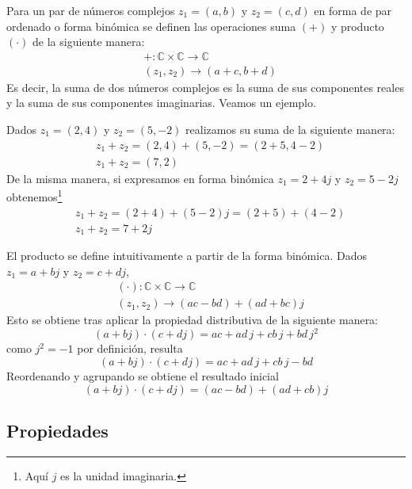 Para un par de números complejos $z_1=(a,b)$ y $z_2=(c,d)$ en forma de par ordenado o forma binómica se definen las operaciones suma $(+)$ y producto $(\cdot)$ de la siguiente manera:
\begin{align*}
  &+:\mathbb{C}\times\mathbb{C}\to \mathbb{C} \\
  &(z_1,z_2)\rightarrow (a+c,b+d)
\end{align*}
Es decir, la suma de dos números complejos es la suma de sus componentes reales y la suma de sus componentes imaginarias. Veamos un ejemplo.
\begin{example}
  Dados $z_1=(2,4)$ y $z_2=(5,-2)$ realizamos su suma de la siguiente manera:
  \begin{align*}
    &z_1+z_2 = (2,4) + (5,-2) = (2+5,4-2) \\
    &\boxed{z_1+z_2 = (7,2)}
  \end{align*}
  De la misma manera, si expresamos en forma binómica $z_1=2+4j$ y $z_2=5-2j$ obtenemos\footnote{Aquí $j$ es la unidad imaginaria.}
  \begin{align*}
    &z_1+z_2 = (2+4) + (5-2)j = (2+5) + (4-2) \\
    &\boxed{z_1+z_2 = 7+2j}
  \end{align*}
\end{example}

El producto se define intuitivamente a partir de la forma binómica. Dados $z_1=a+bj$ y $z_2=c+dj$,
\begin{align*}
  &(\cdot) : \mathbb{C}\times\mathbb{C}\to\mathbb{C}\\ 
  &(z_1,z_2)\rightarrow (ac-bd) + (ad+bc)j
\end{align*}
Esto se obtiene tras aplicar la propiedad distributiva de la siguiente manera:
\begin{equation*}
  (a+bj)\cdot(c+dj) = ac + ad\,j + cb\,j + bd\,j^2
\end{equation*}
como $j^2=-1$ por definición, resulta
\begin{equation*}
  (a+bj)\cdot(c+dj) = ac + ad\,j + cb\,j - bd
\end{equation*}
Reordenando y agrupando se obtiene el resultado inicial
\begin{equation*}
  (a+bj)\cdot(c+dj) = (ac-bd) + (ad+cb)j
\end{equation*}

\subsection{Propiedades}

